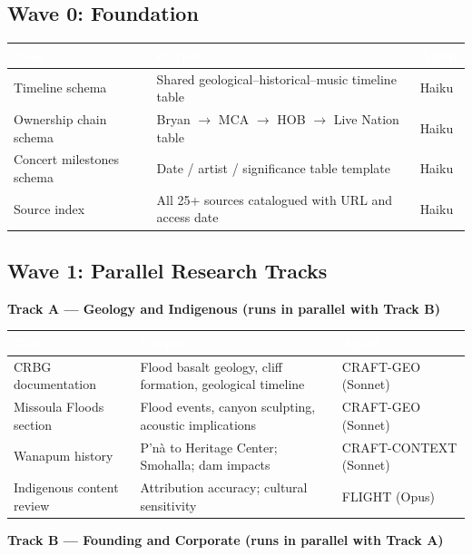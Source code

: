 \documentclass[11pt,letterpaper]{article}
\newcommand{\tableheader}[1]{\textbf{\sffamily\textcolor{white}{#1}}}
\begin{document}
\subsection{Wave 0: Foundation}

\begin{center}
\begin{tabularx}{\textwidth}{L{3.5cm}XC{2cm}}
\toprule
{}
\tableheader{Task} & \tableheader{Output} & \tableheader{Agent} \\
\midrule
Timeline schema & Shared geological--historical--music timeline table & Haiku \\
Ownership chain schema & Bryan $\to$ MCA $\to$ HOB $\to$ Live Nation table & Haiku \\
Concert milestones schema & Date / artist / significance table template & Haiku \\
Source index & All 25+ sources catalogued with URL and access date & Haiku \\
\bottomrule
\end{tabularx}
\end{center}

\subsection{Wave 1: Parallel Research Tracks}

\textbf{Track A --- Geology and Indigenous (runs in parallel with Track B)}

\begin{center}
\begin{tabularx}{\textwidth}{L{3cm}XC{2cm}}
\toprule
{}
\tableheader{Task} & \tableheader{Output} & \tableheader{Agent} \\
\midrule
CRBG documentation & Flood basalt geology, cliff formation, geological timeline & CRAFT-GEO (Sonnet) \\
Missoula Floods section & Flood events, canyon sculpting, acoustic implications & CRAFT-GEO (Sonnet) \\
Wanapum history & P'n\`a to Heritage Center; Smohalla; dam impacts & CRAFT-CONTEXT (Sonnet) \\
Indigenous content review & Attribution accuracy; cultural sensitivity & FLIGHT (Opus) \\
\bottomrule
\end{tabularx}
\end{center}

\textbf{Track B --- Founding and Corporate (runs in parallel with Track A)}
\end{document}
